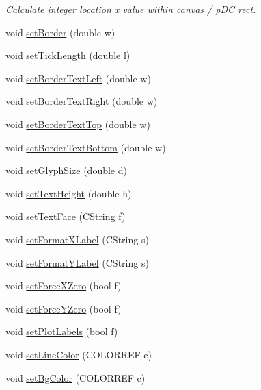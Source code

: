 \begin{DoxyCompactItemize}
\begin{DoxyCompactList}\small\item\em Calculate integer location x value within canvas / pDC rect. \item\end{DoxyCompactList}\item 
void \hyperlink{classCRPGraphHelper_ab2b1cdb192229d3d347e4e279feb4f2e}{setBorder} (double w)
\item 
void \hyperlink{classCRPGraphHelper_a4f3d1cfdf5a027b42117a84e9bf7b6c0}{setTickLength} (double l)
\item 
void \hyperlink{classCRPGraphHelper_a88b24f929b9313db43a56e62e2991a39}{setBorderTextLeft} (double w)
\item 
void \hyperlink{classCRPGraphHelper_a857309875fcdeb43722cb53f63dc91c1}{setBorderTextRight} (double w)
\item 
void \hyperlink{classCRPGraphHelper_a132c5814c959db044a4a5215e870d294}{setBorderTextTop} (double w)
\item 
void \hyperlink{classCRPGraphHelper_a767f703f4ddbd649622a2b5a81732752}{setBorderTextBottom} (double w)
\item 
void \hyperlink{classCRPGraphHelper_a166d8b2cb1ace35b11a93474ad2373c8}{setGlyphSize} (double d)
\item 
void \hyperlink{classCRPGraphHelper_a4639148a061bcfd480366a06e853aa34}{setTextHeight} (double h)
\item 
void \hyperlink{classCRPGraphHelper_af0f4fff3ee51f0f06e6b3016352e30d3}{setTextFace} (CString f)
\item 
void \hyperlink{classCRPGraphHelper_a5f54aa0c2c03adb0751813f11aa9ed23}{setFormatXLabel} (CString s)
\item 
void \hyperlink{classCRPGraphHelper_a2351d7523f0113c6eb37074198f8c2e7}{setFormatYLabel} (CString s)
\item 
void \hyperlink{classCRPGraphHelper_a61104fec5755c0a9b10462292dafffb0}{setForceXZero} (bool f)
\item 
void \hyperlink{classCRPGraphHelper_a8b639b758cd63745acb29bf90165f50b}{setForceYZero} (bool f)
\item 
void \hyperlink{classCRPGraphHelper_a00bac2a1a7a89a78a1417c71f53fbf47}{setPlotLabels} (bool f)
\item 
void \hyperlink{classCRPGraphHelper_a7a2b73ee7a475df8ef19d89b42ed524c}{setLineColor} (COLORREF c)
\item 
void \hyperlink{classCRPGraphHelper_a4c4609e610fdf6f29a82d888e711abbf}{setBgColor} (COLORREF c)

\end{DoxyCompactItemize}

